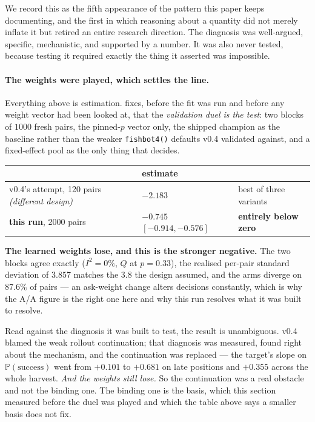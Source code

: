 \documentclass[11pt,letterpaper]{article}
\newcommand{\Prob}{\ensuremath{\mathbb{P}}}
\begin{document}
We record this as the fifth appearance of the pattern this paper keeps
documenting, and the first in which reasoning about a quantity did not merely
inflate it but retired an entire research direction. The diagnosis was
well-argued, specific, mechanistic, and supported by a number. It was also never
tested, because testing it required exactly the thing it asserted was
impossible.

\paragraph{The weights were played, which settles the line.} Everything
above is estimation.  fixes,
before the fit was run and before any weight vector had been looked at, that
the \emph{validation duel is the test}: two blocks of $1000$ fresh pairs, the
pinned-$p$ vector only, the shipped champion as the baseline rather than the
weaker \texttt{fishbot4()} defaults v0.4 validated against, and a fixed-effect
pool as the only thing that decides.

\begin{center}
\small
\begin{tabular}{lll}
\toprule
& estimate & \\
\midrule
v0.4's attempt, 120 pairs \emph{(different design)} & $-2.183$ & best of three variants \\
\textbf{this run}, 2000 pairs & $\mathbf{-0.745}$ $[-0.914, -0.576]$ & \textbf{entirely below zero} \\
\bottomrule
\end{tabular}
\end{center}

\textbf{The learned weights lose, and this is the stronger negative.} The two
blocks agree exactly ($I^2 = 0\%$, $Q$ at $p = 0.33$), the realised per-pair
standard deviation of $3.857$ matches the $3.8$ the design assumed, and the arms
diverge on $87.6\%$ of pairs --- an ask-weight change alters decisions
constantly, which is why the A/A figure is the right one here and why this run
resolves what it was built to resolve.

Read against the diagnosis it was built to test, the result is unambiguous.
v0.4 blamed the weak rollout continuation; that diagnosis was measured, found
right about the mechanism, and the continuation was replaced --- the target's
slope on $\Prob(\text{success})$ went from $+0.101$ to $+0.681$ on late
positions and $+0.355$ across the whole harvest. \emph{And the weights still
lose.} So the continuation was a real obstacle and not the binding one. The
binding one is the basis, which this section measured before the duel was
played and which the table above says a smaller basis does not fix.
\end{document}
